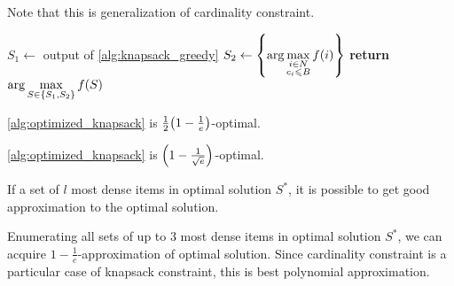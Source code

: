 Note that this is generalization of cardinality constraint.


\begin{algorithm}
	\caption{}\label{alg:optimized_knapsack}
	\begin{algorithmic}[1]
		\State $S_1 \gets$ output of \vref{alg:knapsack_greedy}
		\State $S_2 \gets \qty{\arg\max\limits_{\substack{i\in N\\c_i \leqslant B}} f(i)}$
		\State \textbf{return} $\arg\max\limits_{S\in \qty{S_1,S_2}} f(S)$
		\EndProcedure
	\end{algorithmic}
\end{algorithm}


\begin{prop}
	\vref{alg:optimized_knapsack} is $\frac{1}{2}\qty(1-\frac{1}{e})$-optimal.
\end{prop}
\begin{prop}
	\vref{alg:optimized_knapsack} is $\qty(1-\frac{1}{\sqrt{e}})$-optimal.
\end{prop}

\begin{theorem}
	If a set of $l$ most dense items in optimal solution $S^*$, it is possible to get good approximation to the optimal solution.
	
	Enumerating all sets of up to 3 most dense items in optimal solution $S^*$, we can acquire $1-\frac{1}{e}$-approximation of optimal solution. Since cardinality constraint is a particular case of knapsack constraint, this is best polynomial approximation.
\end{theorem}